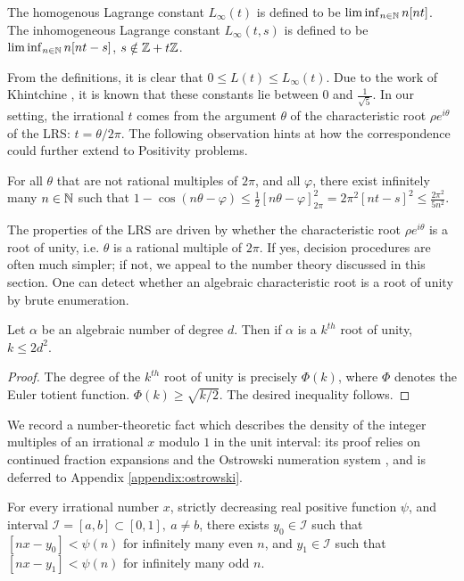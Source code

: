 \begin{definition}
\label{def:Linfty}
The homogenous Lagrange constant $L_\infty(t)$ is defined to be $\liminf_{n \in \mathbb{N}} n[nt]$. The inhomogeneous Lagrange constant $L_\infty(t, s)$ is defined to be\\ $\liminf_{n \in \mathbb{N}} n[nt - s]$, $s \notin \mathbb{Z} + t\mathbb{Z}$.
\end{definition} 

From the definitions, it is clear that $0 \le L(t) \le L_\infty(t)$. Due to the work of Khintchine \cite{khintchine}, it is known that these constants lie between $0$ and $\frac{1}{\sqrt{5}}$. In our setting, the irrational $t$ comes from the argument $\theta$ of the characteristic root $\rho e^{i\theta}$ of the LRS: $t = \theta/2\pi$. The following observation hints at how the correspondence could further extend to Positivity problems.
\begin{lemma}
\label{eq:quadraticdecay}
For all $\theta$ that are not rational multiples of $2\pi$, and all $\varphi$, there exist infinitely many $n\in \mathbb{N}$ such that
$
1 - \cos(n\theta- \varphi) \le \frac{1}{2}\left[n\theta - \varphi \right]_{2\pi}^2 = 2\pi^2[nt -s]^2 \le \frac{2\pi^2}{5n^2}.
$
\end{lemma}

The properties of the LRS are driven by whether the characteristic root $\rho e^{i\theta}$ is a root of unity, i.e. $\theta$ is a rational multiple of $2\pi$. If yes, decision procedures are often much simpler; if not, we appeal to the number theory discussed in this section. One can detect whether an algebraic characteristic root is a root of unity by brute enumeration.

\begin{lemma}
\label{lemma:rootofunity}
Let $\alpha$ be an algebraic number of degree $d$. Then if $\alpha$ is a $k^{th}$ root of unity, $k \le 2d^2$.
\end{lemma}
\begin{proof}
The degree of the $k^{th}$ root of unity is precisely $\Phi(k)$, where $\Phi$ denotes the Euler totient function. $\Phi(k) \ge \sqrt{k/2}$. The desired inequality follows.
\end{proof}

We record a number-theoretic fact which describes the density of the integer multiples of an irrational $x$ modulo $1$ in the unit interval: its proof relies on continued fraction expansions and the Ostrowski numeration system \cite{bourla2016ostrowski,berthe2022dynamics}, and is deferred to Appendix \ref{appendix:ostrowski}.
\begin{lemma}
\label{lemma:existsreal}
For every irrational number $x$, strictly decreasing real positive function $\psi$, and interval $\mathcal{I} = [a, b] \subset [0, 1], ~ a \ne b$, there exists $y_0 \in \mathcal{I}$ such that $[nx - y_0] < \psi(n)$ for infinitely many even $n$, and $y_1 \in \mathcal{I}$ such that $[nx - y_1] < \psi(n)$ for infinitely many odd $n$.
\end{lemma}

